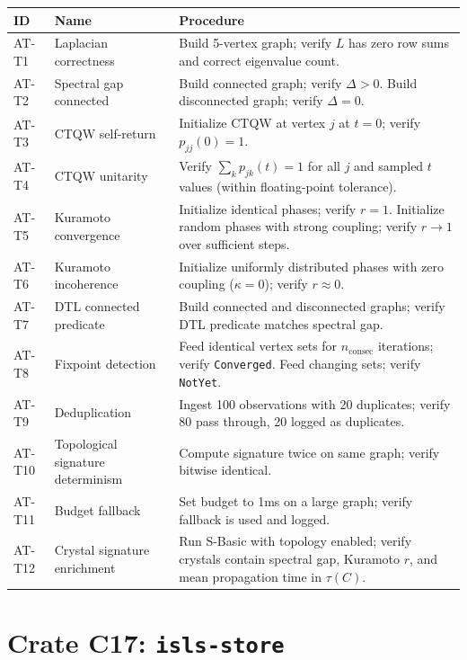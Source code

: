 \documentclass[11pt,a4paper,twoside]{article}
\theoremstyle{definition}
\theoremstyle{plain}
\theoremstyle{remark}
\begin{document}
\begin{longtable}{l l p{7.5cm}}
\toprule
\textbf{ID} & \textbf{Name} & \textbf{Procedure} \\
\midrule
\endfirsthead
\midrule
\endhead
\bottomrule
\endfoot
AT-T1 & Laplacian correctness & Build 5-vertex graph; verify $L$
  has zero row sums and correct eigenvalue count. \\
AT-T2 & Spectral gap connected & Build connected graph; verify
  $\Delta > 0$. Build disconnected graph; verify $\Delta = 0$. \\
AT-T3 & CTQW self-return & Initialize CTQW at vertex $j$ at $t=0$;
  verify $p_{jj}(0) = 1$. \\
AT-T4 & CTQW unitarity & Verify $\sum_k p_{jk}(t) = 1$ for all $j$
  and sampled $t$ values (within floating-point tolerance). \\
AT-T5 & Kuramoto convergence & Initialize identical phases; verify
  $r = 1$. Initialize random phases with strong coupling; verify
  $r \to 1$ over sufficient steps. \\
AT-T6 & Kuramoto incoherence & Initialize uniformly distributed phases
  with zero coupling ($\kappa = 0$); verify $r \approx 0$. \\
AT-T7 & DTL connected predicate & Build connected and disconnected
  graphs; verify DTL predicate matches spectral gap. \\
AT-T8 & Fixpoint detection & Feed identical vertex sets for
  $n_{\mathrm{consec}}$ iterations; verify \texttt{Converged}. Feed
  changing sets; verify \texttt{NotYet}. \\
AT-T9 & Deduplication & Ingest 100 observations with 20 duplicates;
  verify 80 pass through, 20 logged as duplicates. \\
AT-T10 & Topological signature determinism & Compute signature twice
  on same graph; verify bitwise identical. \\
AT-T11 & Budget fallback & Set budget to 1ms on a large graph; verify
  fallback is used and logged. \\
AT-T12 & Crystal signature enrichment & Run S-Basic with topology
  enabled; verify crystals contain spectral gap, Kuramoto $r$, and
  mean propagation time in $\tau(C)$. \\
\end{longtable}


\part{Crate C17: \texttt{isls-store}}\label{part:store}
\end{document}
